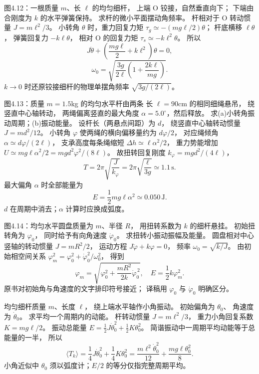 图4.12：一根质量 $m$、长 $\ell$ 的均匀细杆，
上端 O 铰接，自然垂直向下；
下端由合刚度为 $k$ 的水平弹簧保持。
求杆的微小平面摆动角频率。
\exsolution
杆相对于 O 转动惯量
$J=m\ell^2/3$。
小转角 $\theta$ 时，重力回复力矩
$\tau_g\simeq-(mg\ell/2)\theta$；
杆底横移 $\ell\theta$，
弹簧回复力 $-k\ell\theta$，
相对 O 的回复力矩
$\tau_s\simeq-k\ell^2\theta$。
所以
\[
J\ddot\theta+
\left(\frac{mg\ell}{2}+k\ell^2\right)\theta=0,
\]
\[
\boxed{\omega_0=
\sqrt{\frac{3g}{2\ell}
\left(1+\frac{2k\ell}{mg}\right)}}.
\]
\excheck $k\to0$ 时还原铰接细杆的物理单摆角频率 $\sqrt{3g/(2\ell)}$。

图4.13：质量 $m=1.5$kg 的均匀水平杆由两条
长 $\ell=90$cm 的相同细绳悬吊，
绕竖直中心轴转动，
两绳偏离竖直的最大角度
$\alpha=5.0^\circ$，然后释放。
求(a)小转角振动周期；(b)振动能量。
\exsolution
设杆长（两悬点间距）为 $d$，
绕竖直中心轴转动惯量
$J=md^2/12$。
小转角 $\varphi$ 使两绳的横向偏移量约为 $d\varphi/2$，
对应绳倾角 $\alpha\simeq d\varphi/(2\ell)$，
支承高度每条绳缩短
$\Delta h\simeq\ell\alpha^2/2$，
重力势能增加
$U\simeq mg\ell\alpha^2/2
=mgd^2\varphi^2/(8\ell)$。
故扭转回复刚度 $k_\varphi=mgd^2/(4\ell)$，
\[
\boxed{T=2\pi\sqrt{\frac{J}{k_\varphi}}
=2\pi\sqrt{\frac{\ell}{3g}}
\simeq1.1\,\mathrm s}.
\]
最大偏角 $\alpha$ 时全部能量为
\[
\boxed{E=\frac12mg\ell\alpha^2
\simeq0.050\,\mathrm J}.
\]
\excheck $d$ 在周期中消去；$\alpha$ 计算时应换成弧度。

图4.14：均匀水平圆盘质量为 $m$、半径 $R$，
用扭转系数为 $k$ 的细杆悬挂。
初始扭转角为 $\varphi_0$，
同时给予有向角速度 $\dot\varphi_0$。
求扭转小振动振幅及能量。
\exsolution
圆盘相对中心竖轴的转动惯量
$J=mR^2/2$，
运动方程
$J\ddot\varphi+k\varphi=0$，
频率
$\omega_0=\sqrt{k/J}$。
由初始相空间关系
$\varphi_m^2=\varphi_0^2+
\dot\varphi_0^2/\omega_0^2$，
得到
\[
\boxed{\varphi_m=
\sqrt{\varphi_0^2+\frac{mR^2}{2k}
\dot\varphi_0^{\,2}}},
\quad
\boxed{E=\frac12k\varphi_m^2}.
\]
\excheck 原书对初始角与角速度的文字排印符号接近；
译稿用 $\varphi_0$ 与 $\dot\varphi_0$ 明确区分。

均匀细杆质量 $m$、长度 $\ell$，
绕上端水平轴作小角振动。
初始偏角为 $\theta_0$、
角速度为 $\dot\theta_0$。
求平均一个周期内的动能。
\exsolution
杆转动惯量
$J=m\ell^2/3$，
重力小角回复系数
$K=mg\ell/2$。
振动总能量
$E=\tfrac12J\dot\theta_0^2+
\tfrac12K\theta_0^2$。
简谐振动中一周期平均动能等于总能量的一半，
所以
\[
\boxed{\langle T_k\rangle=
\frac14J\dot\theta_0^2+
\frac14K\theta_0^2
=\frac{m\ell^2\dot\theta_0^2}{12}
+\frac{mg\ell\theta_0^2}{8}}.
\]
\excheck 小角近似中 $\theta_0$ 须以弧度计；$E/2$ 的等分仅指完整周期平均。

